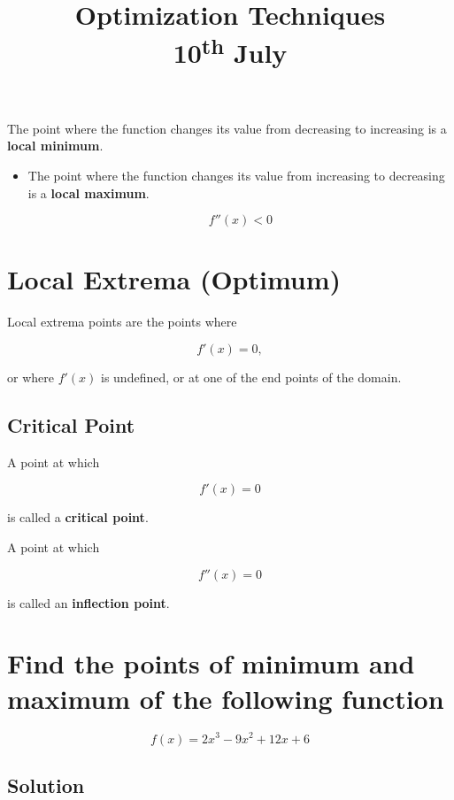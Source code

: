 \documentclass{article}
\begin{document}
The point where the function changes its value from decreasing to increasing is a \textbf{local minimum}.

\begin{itemize}
    \item The point where the function changes its value from increasing to decreasing is a \textbf{local maximum}.
    
    \[
    f''(x) < 0
    \]
\end{itemize}

\section*{Local Extrema (Optimum)}

Local extrema points are the points where

\[
f'(x)=0,
\]

or where $f'(x)$ is undefined, or at one of the end points of the domain.

\vspace{0.5cm}

\subsection*{Critical Point}

A point at which

\[
f'(x)=0
\]

is called a \textbf{critical point}.

A point at which

\[
f''(x)=0
\]

is called an \textbf{inflection point}.





\title{Optimization Techniques \\ 10\textsuperscript{th} July}
\date{}
\maketitle

\section*{Find the points of minimum and maximum of the following function}

\[
f(x)=2x^3-9x^2+12x+6
\]

\subsection*{Solution}
\end{document}
